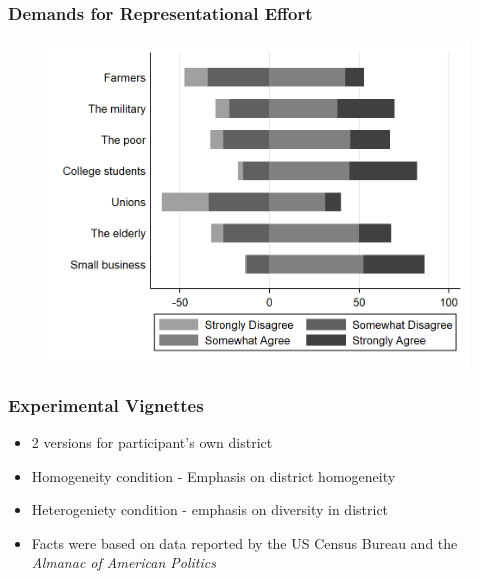 \documentclass[14pt]{beamer}
\newcommand\e{\emph}
\begin{document}
\begin{frame}
\frametitle{Demands for Representational Effort}
\begin{figure}
	\centering
	{\includegraphics[width=.8\textwidth]{Figure2}}
\end{figure}
\end{frame}

\begin{frame}
\frametitle{Experimental Vignettes}
\begin{itemize}
	\item 2 versions for participant's own district
	\item Homogeneity condition - Emphasis on district homogeneity
	\item Heterogeniety condition - emphasis on diversity in district
	\item Facts were based on data reported by the US Census Bureau and the \e{Almanac of American Politics}
\end{itemize}
\end{frame}
\end{document}
